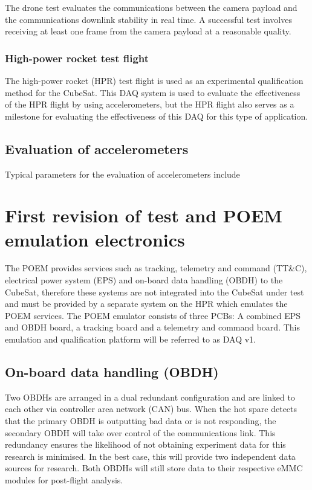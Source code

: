 \documentclass[a4paper,11pt]{article}
\begin{document}
The drone test evaluates the communications between the camera payload and the communications downlink stability in real time. A successful test involves receiving at least one frame from the camera payload at a reasonable quality.

\subsubsection{High-power rocket test flight}

The high-power rocket (HPR) test flight is used as an experimental qualification method for the CubeSat. This DAQ system is used to evaluate the effectiveness of the HPR flight by using accelerometers, but the HPR flight also serves as a milestone for evaluating the effectiveness of this DAQ for this type of application.

\subsection{Evaluation of accelerometers}

Typical parameters for the evaluation of accelerometers include 

\section{First revision of test and POEM emulation electronics}

The POEM provides services such as tracking, telemetry and command (TT\&C), electrical power system (EPS) and on-board data handling (OBDH) to the CubeSat, therefore these systems are not integrated into the CubeSat under test and must be provided by a separate system on the HPR which emulates the POEM services. The POEM emulator consists of three PCBs: A combined EPS and OBDH board, a tracking board and a telemetry and command board. This emulation and qualification platform will be referred to as DAQ v1.

\subsection{On-board data handling (OBDH)}
Two OBDHs are arranged in a dual redundant configuration and are linked to each other via controller area network (CAN) bus. When the hot spare detects that the primary OBDH is outputting bad data or is not responding, the secondary OBDH will take over control of the communications link. This redundancy ensures the likelihood of not obtaining experiment data for this research is minimised. In the best case, this will provide two independent data sources for research. Both OBDHs will still store data to their respective eMMC modules for post-flight analysis.
\end{document}
